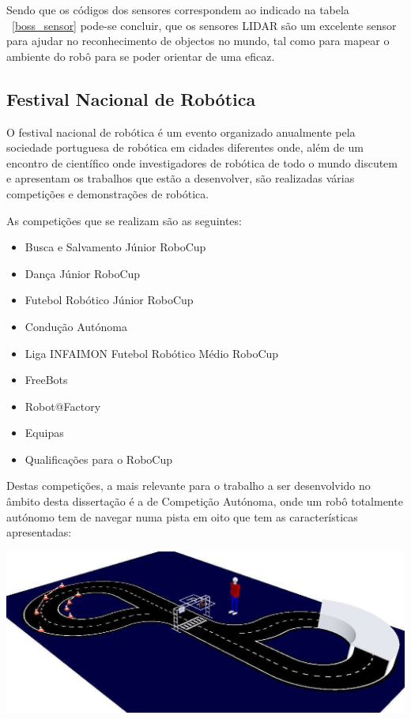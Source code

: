 Sendo que os códigos dos sensores correspondem ao indicado na tabela ~\ref{boss_sensor}
pode-se concluir, que os sensores LIDAR são um excelente sensor para ajudar no reconhecimento
de objectos no mundo, tal como para mapear o ambiente do robô para se poder orientar de uma eficaz.


\subsection{Festival Nacional de Robótica}

O festival nacional de robótica é um evento organizado anualmente pela sociedade
portuguesa de robótica em cidades diferentes onde, além de um encontro de científico
onde investigadores de robótica de todo o mundo discutem e apresentam os trabalhos
que estão a desenvolver, são realizadas várias competições e demonstrações de robótica.

As competições que se realizam são as seguintes:
\begin{itemize}
\item    Busca e Salvamento Júnior RoboCup
\item    Dança Júnior RoboCup
\item    Futebol Robótico Júnior RoboCup
\item    Condução Autónoma
\item    Liga INFAIMON Futebol Robótico Médio RoboCup
\item    FreeBots
\item    Robot@Factory
\item    Equipas
\item    Qualificações para o RoboCup
\end{itemize}

Destas competições, a mais relevante para o trabalho a ser desenvolvido no 
âmbito desta dissertação é a de Competição Autónoma, onde um robô totalmente 
autónomo tem de navegar numa pista em oito que tem as características apresentadas:

\begin{center}
	\includegraphics[width=1.00\textwidth]{figures/ca_pista.png}
	\label{fig:3}
\end{center}

